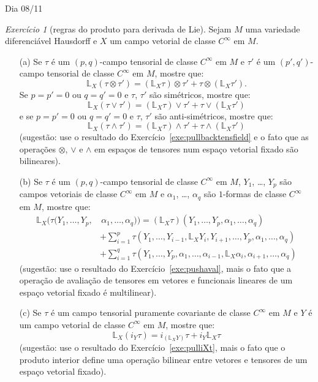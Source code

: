 \documentclass[oneside,11pt]{amsart}
\theoremstyle{remark}\newtheorem{exercise}{Exercício}[section]
\theoremstyle{plain}\newtheorem{teo}{Teorema}[section]
\theoremstyle{plain}\newtheorem{lem}[teo]{Lema}
\theoremstyle{plain}\newtheorem{prop}[teo]{Proposição}
\theoremstyle{definition}\newtheorem{defin}[teo]{Definição}
\theoremstyle{remark}\newtheorem{rem}[teo]{Observação}
\theoremstyle{definition}\newtheorem{example}[teo]{Exemplo}
\numberwithin{equation}{section}
\begin{document}
\begin{section}{Dia 08/11}
\begin{exercise}[regras do produto para derivada de Lie]\label{exe:Lieregraprod}
Sejam $M$ uma variedade diferenciável Hausdorff e $X$ um campo vetorial de classe $C^\infty$ em $M$.
\begin{itemize}
\item[(a)] Se $\tau$ é um $(p,q)$-campo tensorial de classe $C^\infty$ em $M$ e $\tau'$ é um $(p',q')$-campo tensorial de classe
$C^\infty$ em $M$, mostre que:
\[\mathbb L_X(\tau\otimes\tau')=(\mathbb L_X\tau)\otimes\tau'+\tau\otimes(\mathbb L_X\tau').\]
Se $p=p'=0$ ou $q=q'=0$ e $\tau$, $\tau'$ são simétricos, mostre que:
\[\mathbb L_X(\tau\vee\tau')=(\mathbb L_X\tau)\vee\tau'+\tau\vee(\mathbb L_X\tau')\]
e se $p=p'=0$ ou $q=q'=0$ e $\tau$, $\tau'$ são anti-simétricos, mostre que:
\[\mathbb L_X(\tau\wedge\tau')=(\mathbb L_X\tau)\wedge\tau'+\tau\wedge(\mathbb L_X\tau')\]
(sugestão: use o resultado do Exercício~\ref{exe:pullbacktensfield} e o fato que as operações $\otimes$, $\vee$ e $\wedge$ em espaços
de tensores num espaço vetorial fixado são bilineares).
\item[(b)] Se $\tau$ é um $(p,q)$-campo tensorial de classe $C^\infty$ em $M$, $Y_1$, \dots, $Y_p$ são campos vetoriais de classe $C^\infty$ em $M$
e $\alpha_1$, \dots, $\alpha_q$ são $1$-formas de classe $C^\infty$ em $M$, mostre que:
\begin{align*}
\mathbb L_X\big(\tau(Y_1,\ldots,Y_p,&\,\alpha_1,\ldots,\alpha_q)\big)=(\mathbb L_X\tau)(Y_1,\ldots,Y_p,\alpha_1,\ldots,\alpha_q)\\
&+\sum_{i=1}^p\tau(Y_1,\ldots,Y_{i-1},\mathbb L_XY_i,Y_{i+1},\ldots,Y_p,\alpha_1,\ldots,\alpha_q)\\
&+\sum_{i=1}^q\tau(Y_1,\ldots,Y_p,\alpha_1,\ldots,\alpha_{i-1},\mathbb L_X\alpha_i,\alpha_{i+1},\ldots,\alpha_q)
\end{align*}
(sugestão: use o resultado do Exercício~\ref{exe:pushaval}, mais o fato que a operação de avaliação de tensores em vetores e funcionais lineares
de um espaço vetorial fixado é multilinear).
\item[(c)] Se $\tau$ é um campo tensorial puramente covariante de classe $C^\infty$ em $M$ e $Y$ é um campo vetorial de classe $C^\infty$ em $M$, mostre que:
\[\mathbb L_X(i_Y\tau)=i_{(\mathbb L_XY)}\tau+i_Y\mathbb L_X\tau\]
(sugestão: use o resultado do Exercício~\ref{exe:pulliXt}, mais o fato que o produto interior define uma operação bilinear entre vetores e tensores de um espaço
vetorial fixado).
\end{itemize}
\end{exercise}


\end{section}
\end{document}
